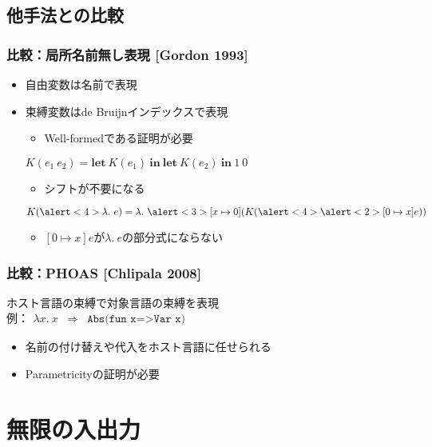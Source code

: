 \documentclass[t,dvipdfmx,cjk,xcolor=dvipsnames,envcountsect,notheorems,12pt]{beamer}
\theoremstyle{definition}
\newcommand{\keyword}[1]{\mathbf{#1}}
\newcommand{\LET}{\keyword{let}}
\newcommand{\IN}{\keyword{in}}
\begin{document}
\subsection{他手法との比較}

\begin{frame}
	\frametitle{比較：局所名前無し表現 [Gordon 1993]}
	\Large
	\begin{itemize}
		\item 自由変数は名前で表現
		\item 束縛変数はde Bruijnインデックスで表現\\
			\begin{itemize}
				\item Well-formedである証明が必要
			\end{itemize}
			$K(e_1~e_2) = \LET~ K(e_1)~\IN~\LET~K(e_2)~\IN~1~0$
			\begin{itemize}
				\item シフトが不要になる
			\end{itemize}
			$K(\alert<4>{\lambda.~e}) = \lambda.~\alert<3>{[x\mapsto 0]}(K(\alert<4>{\alert<2>{[0\mapsto x]}e}))$
			\begin{itemize}
				\item $[0\mapsto x]e$が$\lambda.~e$の部分式にならない
			\end{itemize}
	\end{itemize}
	\pause
\end{frame}

\begin{frame}
	\frametitle{比較：PHOAS [Chlipala 2008]}
	\LARGE ホスト言語の束縛で対象言語の束縛を表現\\
	例：$\begin{array}{lcl}
		\lambda x.~x & \Rightarrow & \texttt{Abs(fun x=>Var x)}
	\end{array}$
	\begin{itemize}
		\item 名前の付け替えや代入をホスト言語に任せられる
		\item Parametricityの証明が必要
	\end{itemize}
\end{frame}

\section{無限の入出力}
\end{document}
